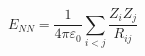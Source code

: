 \documentclass[12pt]{article}
\begin{document}
$$ 
E_{NN}  = \frac{1}{{4\pi \varepsilon _0 }}\sum\limits_{i < j} {\frac{{Z_i Z_j }}{{R_{ij} }}}
$$
\end{document}
